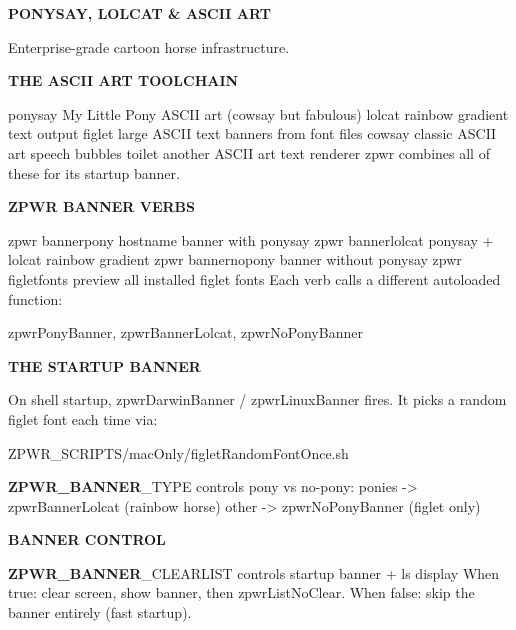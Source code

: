 \documentclass[11pt,a4paper,twoside]{book}
\begin{document}
\vspace{10pt}
{\large\bfseries\color{neoncyan} PONYSAY, LOLCAT \& ASCII ART}\vspace{6pt}

Enterprise-grade cartoon horse infrastructure.


\vspace{12pt}
{\bfseries\color{neonyellow} THE ASCII ART TOOLCHAIN}\vspace{4pt}

ponysay    My Little Pony ASCII art (cowsay but fabulous) lolcat     rainbow gradient text output figlet     large ASCII text banners from font files cowsay     classic ASCII art speech bubbles toilet     another ASCII art text renderer zpwr combines all of these for its startup banner.


\vspace{12pt}
{\bfseries\color{neonyellow} \textbf{ZPWR} BANNER VERBS}\vspace{4pt}

zpwr bannerpony      hostname banner with ponysay zpwr bannerlolcat    ponysay + lolcat rainbow gradient zpwr bannernopony    banner without ponysay zpwr figletfonts     preview all installed figlet fonts Each verb calls a different autoloaded function:

\begin{codebox}
\color{neongreen}zpwrPonyBanner, zpwrBannerLolcat, zpwrNoPonyBanner\\
\end{codebox}


\vspace{12pt}
{\bfseries\color{neonyellow} THE STARTUP BANNER}\vspace{4pt}

On shell startup, zpwrDarwinBanner / zpwrLinuxBanner fires. It picks a random figlet font each time via:

\begin{codebox}
\color{neongreen}ZPWR\_SCRIPTS/macOnly/figletRandomFontOnce.sh\\
\end{codebox}

\textbf{ZPWR\_BANNER}\_TYPE controls pony vs no-pony: ponies  -> zpwrBannerLolcat (rainbow horse) other   -> zpwrNoPonyBanner (figlet only)


\vspace{12pt}
{\bfseries\color{neonyellow} BANNER CONTROL}\vspace{4pt}

\textbf{ZPWR\_BANNER}\_CLEARLIST  controls startup banner + ls display When true: clear screen, show banner, then zpwrListNoClear. When false: skip the banner entirely (fast startup).
\end{document}
